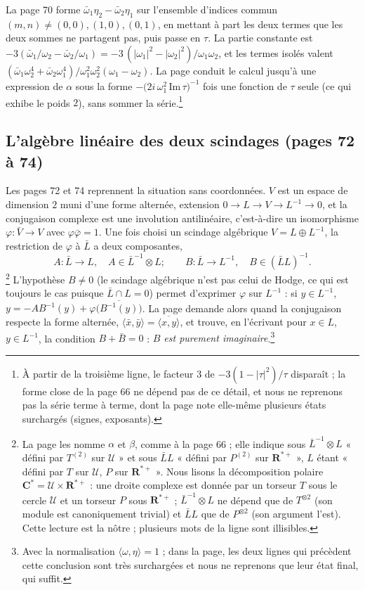 \documentclass[11pt,a4paper]{article}
\begin{document}
La page 70 forme $\bar\omega_1\eta_2 - \bar\omega_2\eta_1$ sur l'ensemble
d'indices commun $(m,n) \neq (0,0), (1,0), (0,1)$, en mettant à part les deux
termes que les deux sommes ne partagent pas, puis passe en $\tau$. La partie
constante est $-3(\bar\omega_1/\omega_2 - \bar\omega_2/\omega_1) =
-3\,(|\omega_1|^2 - |\omega_2|^2)/\omega_1\omega_2$, et les termes isolés
valent $(\bar\omega_1\omega_2^4 + \bar\omega_2\omega_1^4)/\omega_1^2\omega_2^2
(\omega_1-\omega_2)$. La page conduit le calcul jusqu'à une expression de
$\alpha$ sous la forme $-\bigl(2i\,\omega_1^2\,\mathrm{Im}\,\tau\bigr)^{-1}$
fois une fonction de $\tau$ seule (ce qui exhibe le poids $2$), sans
sommer la série.\footnote{À partir de la troisième ligne, le facteur $3$ de
$-3(1-|\tau|^2)/\tau$ disparaît ; la forme close de la page 66 ne dépend pas
de ce détail, et nous ne reprenons pas la série terme à terme, dont la page
note elle-même plusieurs états surchargés (signes, exposants).}

\subsection*{L'algèbre linéaire des deux scindages (pages 72 à 74)}

Les pages 72 et 74 reprennent la situation sans coordonnées. $V$ est un espace
de dimension $2$ muni d'une forme alternée, extension $0 \to L \to V \to
L^{-1} \to 0$, et la conjugaison complexe est une involution antilinéaire,
c'est-à-dire un isomorphisme $\varphi\colon \bar V \to V$ avec $\varphi\bar\varphi
= 1$. Une fois choisi un scindage algébrique $V = L \oplus L^{-1}$, la
restriction de $\varphi$ à $\bar L$ a deux composantes,
\[
A\colon \bar L \to L, \quad A \in \bar L^{-1}\otimes L ; \qquad
B\colon \bar L \to L^{-1}, \quad B \in (\bar L L)^{-1}.
\]
\footnote{La page les nomme $\alpha$ et $\beta$, comme à la page 66 ; elle
indique sous $\bar L^{-1}\otimes L$ « défini par $T^{(2)}$ sur $\mathcal{U}$ »
et sous $\bar L L$ « défini par $P^{(2)}$ sur $\mathbf{R}^{*+}$ », $L$ étant
« défini par $T$ sur $\mathcal{U}$, $P$ sur $\mathbf{R}^{*+}$ ». Nous lisons
la décomposition polaire $\mathbf{C}^* = \mathcal{U} \times \mathbf{R}^{*+}$ :
une droite complexe est donnée par un torseur $T$ sous le cercle
$\mathcal{U}$ et un torseur $P$ sous $\mathbf{R}^{*+}$ ; $\bar L^{-1} \otimes
L$ ne dépend que de $T^{\otimes 2}$ (son module est canoniquement trivial) et
$\bar L L$ que de $P^{\otimes 2}$ (son argument l'est). Cette lecture est la
nôtre ; plusieurs mots de la ligne sont illisibles.}
L'hypothèse $B \neq 0$ (le scindage algébrique n'est pas celui de Hodge, ce
qui est toujours le cas puisque $\bar L \cap L = 0$) permet d'exprimer
$\varphi$ sur $L^{-1}$ : si $y \in L^{-1}$, $y = -AB^{-1}(y) +
\varphi\bigl(\overline{B^{-1}(y)}\bigr)$. La page demande alors quand la
conjugaison respecte la forme alternée, $\langle \bar x, \bar y\rangle =
\overline{\langle x, y\rangle}$, et trouve, en l'écrivant pour $x \in L$, $y
\in L^{-1}$, la condition $B + \bar B = 0$ : \emph{$B$ est purement
imaginaire}.\footnote{Avec la normalisation $\langle\omega,\eta\rangle = 1$ ;
dans la page, les deux lignes qui précèdent cette conclusion sont très
surchargées et nous ne reprenons que leur état final, qui suffit.}
\end{document}
